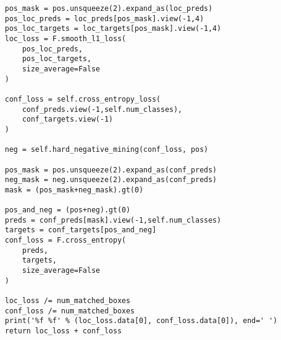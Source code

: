 \begin{lstlisting}[caption={损失函数}]
pos_mask = pos.unsqueeze(2).expand_as(loc_preds)    
pos_loc_preds = loc_preds[pos_mask].view(-1,4)     
pos_loc_targets = loc_targets[pos_mask].view(-1,4) 
loc_loss = F.smooth_l1_loss(
	pos_loc_preds,
	pos_loc_targets, 
	size_average=False
)

conf_loss = self.cross_entropy_loss(
	conf_preds.view(-1,self.num_classes), 
	conf_targets.view(-1)
)
	 
neg = self.hard_negative_mining(conf_loss, pos)   

pos_mask = pos.unsqueeze(2).expand_as(conf_preds)  
neg_mask = neg.unsqueeze(2).expand_as(conf_preds)  
mask = (pos_mask+neg_mask).gt(0)

pos_and_neg = (pos+neg).gt(0)
preds = conf_preds[mask].view(-1,self.num_classes)  
targets = conf_targets[pos_and_neg]              
conf_loss = F.cross_entropy(
	preds, 
	targets, 
	size_average=False
)

loc_loss /= num_matched_boxes
conf_loss /= num_matched_boxes
print('%f %f' % (loc_loss.data[0], conf_loss.data[0]), end=' ')
return loc_loss + conf_loss
\end{lstlisting}